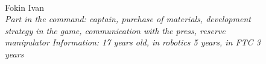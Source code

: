\begin{figure}[H]
	\begin{minipage}[h]{0.47\linewidth}
		\\
		Fokin Ivan\\
		\emph{Part in the command: captain,   purchase of materials,  development strategy in the game,  communication with the press, reserve  manipulator }
		\emph{Information: 17 years old, in robotics 5 years, in FTC 3 years } 
	\end{minipage}
	\hfill
	\begin{minipage}[h]{0.47\linewidth}

\end{minipage}
\end{figure}
